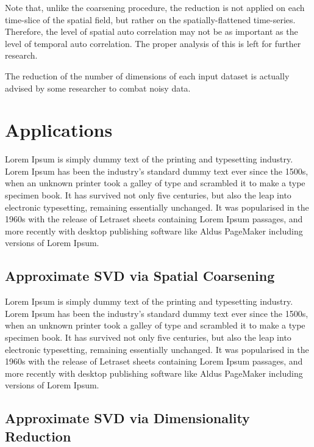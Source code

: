 \documentclass{acm_proc_article-sp}
\begin{document}
Note that, unlike the coarsening procedure, the reduction is not applied on each time-slice of the spatial field, but rather on the spatially-flattened time-series. Therefore, the level of spatial auto correlation may not be as important as the level of temporal auto correlation. The proper analysis of this is left for further research.

The reduction of the number of dimensions of each input dataset is actually advised by some researcher to combat noisy data.

\section{Applications}
\label{Applications}

Lorem Ipsum is simply dummy text of the printing and typesetting industry. Lorem Ipsum has been the industry's standard dummy text ever since the 1500s, when an unknown printer took a galley of type and scrambled it to make a type specimen book. It has survived not only five centuries, but also the leap into electronic typesetting, remaining essentially unchanged. It was popularised in the 1960s with the release of Letraset sheets containing Lorem Ipsum passages, and more recently with desktop publishing software like Aldus PageMaker including versions of Lorem Ipsum.

\subsection{Approximate SVD via Spatial Coarsening}
\label{sec:Applications Approximate SVD via Spatial Coarsening}

Lorem Ipsum is simply dummy text of the printing and typesetting industry. Lorem Ipsum has been the industry's standard dummy text ever since the 1500s, when an unknown printer took a galley of type and scrambled it to make a type specimen book. It has survived not only five centuries, but also the leap into electronic typesetting, remaining essentially unchanged. It was popularised in the 1960s with the release of Letraset sheets containing Lorem Ipsum passages, and more recently with desktop publishing software like Aldus PageMaker including versions of Lorem Ipsum.

\subsection{Approximate SVD via Dimensionality Reduction}
\label{sec:Applications Approximate SVD via Dimensionality Reduction}
\end{document}
